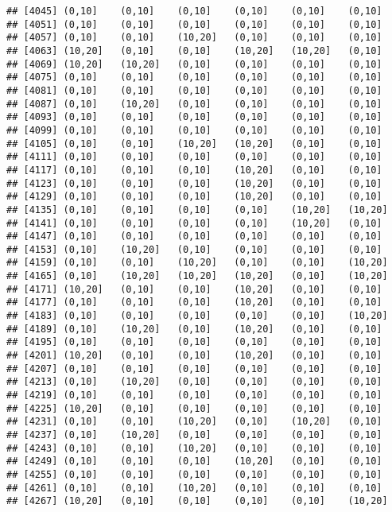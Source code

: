\documentclass[]{article}
\begin{document}
\begin{verbatim}
## [4045] (0,10]    (0,10]    (0,10]    (0,10]    (0,10]    (0,10]   
## [4051] (0,10]    (0,10]    (0,10]    (0,10]    (0,10]    (0,10]   
## [4057] (0,10]    (0,10]    (10,20]   (0,10]    (0,10]    (0,10]   
## [4063] (10,20]   (0,10]    (0,10]    (10,20]   (10,20]   (0,10]   
## [4069] (10,20]   (10,20]   (0,10]    (0,10]    (0,10]    (0,10]   
## [4075] (0,10]    (0,10]    (0,10]    (0,10]    (0,10]    (0,10]   
## [4081] (0,10]    (0,10]    (0,10]    (0,10]    (0,10]    (0,10]   
## [4087] (0,10]    (10,20]   (0,10]    (0,10]    (0,10]    (0,10]   
## [4093] (0,10]    (0,10]    (0,10]    (0,10]    (0,10]    (0,10]   
## [4099] (0,10]    (0,10]    (0,10]    (0,10]    (0,10]    (0,10]   
## [4105] (0,10]    (0,10]    (10,20]   (10,20]   (0,10]    (0,10]   
## [4111] (0,10]    (0,10]    (0,10]    (0,10]    (0,10]    (0,10]   
## [4117] (0,10]    (0,10]    (0,10]    (10,20]   (0,10]    (0,10]   
## [4123] (0,10]    (0,10]    (0,10]    (10,20]   (0,10]    (0,10]   
## [4129] (0,10]    (0,10]    (0,10]    (10,20]   (0,10]    (0,10]   
## [4135] (0,10]    (0,10]    (0,10]    (0,10]    (10,20]   (10,20]  
## [4141] (0,10]    (0,10]    (0,10]    (0,10]    (10,20]   (0,10]   
## [4147] (0,10]    (0,10]    (0,10]    (0,10]    (0,10]    (0,10]   
## [4153] (0,10]    (10,20]   (0,10]    (0,10]    (0,10]    (0,10]   
## [4159] (0,10]    (0,10]    (10,20]   (0,10]    (0,10]    (10,20]  
## [4165] (0,10]    (10,20]   (10,20]   (10,20]   (0,10]    (10,20]  
## [4171] (10,20]   (0,10]    (0,10]    (10,20]   (0,10]    (0,10]   
## [4177] (0,10]    (0,10]    (0,10]    (10,20]   (0,10]    (0,10]   
## [4183] (0,10]    (0,10]    (0,10]    (0,10]    (0,10]    (10,20]  
## [4189] (0,10]    (10,20]   (0,10]    (10,20]   (0,10]    (0,10]   
## [4195] (0,10]    (0,10]    (0,10]    (0,10]    (0,10]    (0,10]   
## [4201] (10,20]   (0,10]    (0,10]    (10,20]   (0,10]    (0,10]   
## [4207] (0,10]    (0,10]    (0,10]    (0,10]    (0,10]    (0,10]   
## [4213] (0,10]    (10,20]   (0,10]    (0,10]    (0,10]    (0,10]   
## [4219] (0,10]    (0,10]    (0,10]    (0,10]    (0,10]    (0,10]   
## [4225] (10,20]   (0,10]    (0,10]    (0,10]    (0,10]    (0,10]   
## [4231] (0,10]    (0,10]    (10,20]   (0,10]    (10,20]   (0,10]   
## [4237] (0,10]    (10,20]   (0,10]    (0,10]    (0,10]    (0,10]   
## [4243] (0,10]    (0,10]    (10,20]   (0,10]    (0,10]    (0,10]   
## [4249] (0,10]    (0,10]    (0,10]    (10,20]   (0,10]    (0,10]   
## [4255] (0,10]    (0,10]    (0,10]    (0,10]    (0,10]    (0,10]   
## [4261] (0,10]    (0,10]    (10,20]   (0,10]    (0,10]    (0,10]   
## [4267] (10,20]   (0,10]    (0,10]    (0,10]    (0,10]    (10,20]  

\end{verbatim}
\end{document}
